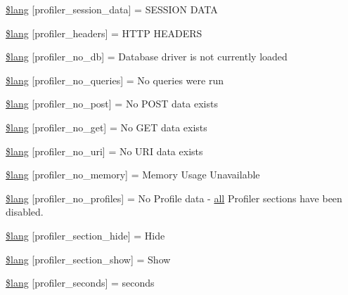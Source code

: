 \begin{DoxyCompactItemize}
\item 
\hyperlink{profiler__lang_8php_a6caa2b856b3211345f4a916febd79a84}{\$lang} \mbox{[}\textquotesingle{}profiler\+\_\+session\+\_\+data\textquotesingle{}\mbox{]} = \textquotesingle{}S\+E\+S\+S\+I\+O\+N D\+A\+T\+A\textquotesingle{}
\item 
\hyperlink{profiler__lang_8php_a079eb6971dec0c6115344e4b621e235f}{\$lang} \mbox{[}\textquotesingle{}profiler\+\_\+headers\textquotesingle{}\mbox{]} = \textquotesingle{}H\+T\+T\+P H\+E\+A\+D\+E\+R\+S\textquotesingle{}
\item 
\hyperlink{profiler__lang_8php_a74da0e429477e757130da70e135d4ae9}{\$lang} \mbox{[}\textquotesingle{}profiler\+\_\+no\+\_\+db\textquotesingle{}\mbox{]} = \textquotesingle{}Database driver is not currently loaded\textquotesingle{}
\item 
\hyperlink{profiler__lang_8php_a783abf2a3410bbc9c32e4b7bb774724b}{\$lang} \mbox{[}\textquotesingle{}profiler\+\_\+no\+\_\+queries\textquotesingle{}\mbox{]} = \textquotesingle{}No queries were run\textquotesingle{}
\item 
\hyperlink{profiler__lang_8php_a06e8171d08be812398060c126233a237}{\$lang} \mbox{[}\textquotesingle{}profiler\+\_\+no\+\_\+post\textquotesingle{}\mbox{]} = \textquotesingle{}No P\+O\+S\+T data exists\textquotesingle{}
\item 
\hyperlink{profiler__lang_8php_a8ecf037acbeb4a7b202b8238c8d1a328}{\$lang} \mbox{[}\textquotesingle{}profiler\+\_\+no\+\_\+get\textquotesingle{}\mbox{]} = \textquotesingle{}No G\+E\+T data exists\textquotesingle{}
\item 
\hyperlink{profiler__lang_8php_ac7d16f2f99b12aeaa609be6bcb89759e}{\$lang} \mbox{[}\textquotesingle{}profiler\+\_\+no\+\_\+uri\textquotesingle{}\mbox{]} = \textquotesingle{}No U\+R\+I data exists\textquotesingle{}
\item 
\hyperlink{profiler__lang_8php_a32345afdaa3f160ba1d21d03223313ad}{\$lang} \mbox{[}\textquotesingle{}profiler\+\_\+no\+\_\+memory\textquotesingle{}\mbox{]} = \textquotesingle{}Memory Usage Unavailable\textquotesingle{}
\item 
\hyperlink{profiler__lang_8php_aabea841eed12fa8271f13656fa7d5457}{\$lang} \mbox{[}\textquotesingle{}profiler\+\_\+no\+\_\+profiles\textquotesingle{}\mbox{]} = \textquotesingle{}No Profile data -\/ \hyperlink{change_team_8php_a5f3fcf87333f5770d16608f67ad88d19}{all} Profiler sections have been disabled.\textquotesingle{}
\item 
\hyperlink{profiler__lang_8php_a137158ebe1d58bd53bbbb4594f2bc0ed}{\$lang} \mbox{[}\textquotesingle{}profiler\+\_\+section\+\_\+hide\textquotesingle{}\mbox{]} = \textquotesingle{}Hide\textquotesingle{}
\item 
\hyperlink{profiler__lang_8php_a3e3b1984f57780efbdaf6d01dac31f3c}{\$lang} \mbox{[}\textquotesingle{}profiler\+\_\+section\+\_\+show\textquotesingle{}\mbox{]} = \textquotesingle{}Show\textquotesingle{}
\item 
\hyperlink{profiler__lang_8php_a6d6060d6ca0da3c1e6d4168914d7e362}{\$lang} \mbox{[}\textquotesingle{}profiler\+\_\+seconds\textquotesingle{}\mbox{]} = \textquotesingle{}seconds\textquotesingle{}
\end{DoxyCompactItemize}


